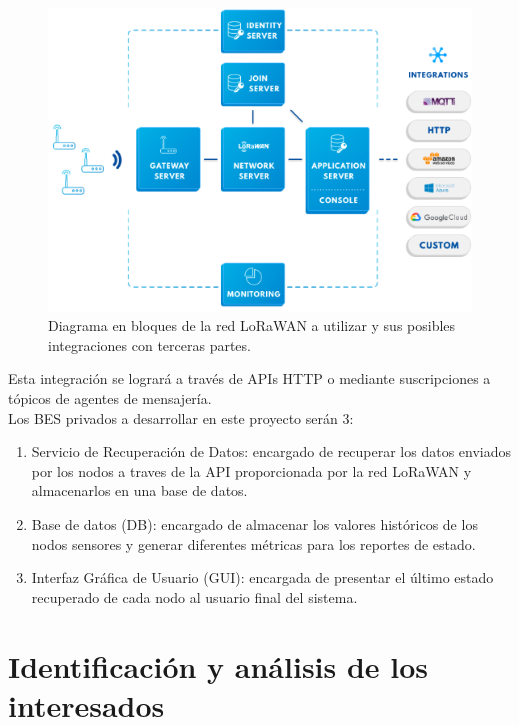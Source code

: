 \documentclass[11pt]{charter}
\begin{document}
\begin{figure}[H]
	\centering 
	\includegraphics[width=\textwidth]{./Figuras/arquitectura_TTN.png}
	\caption{Diagrama en bloques de la red LoRaWAN a utilizar y sus posibles integraciones con terceras partes.}
	\label{fig:diagBloquesLoRaWAN}
\end{figure}

Esta integración se logrará a través de APIs HTTP o mediante suscripciones a tópicos de agentes de mensajería.\\
Los BES privados a desarrollar en este proyecto serán 3:
\begin{enumerate}
	\item Servicio de Recuperación de Datos: encargado de recuperar los datos enviados por los nodos a traves de la API proporcionada por la red LoRaWAN y almacenarlos en una base de datos.
	\item Base de datos (DB): encargado de almacenar los valores históricos de los nodos sensores y generar diferentes métricas para los reportes de estado.
	\item Interfaz Gráfica de Usuario (GUI): encargada de presentar el último estado recuperado de cada nodo al usuario final del sistema.
\end{enumerate}


\section{Identificación y análisis de los interesados}
\label{sec:interesados}
\end{document}
